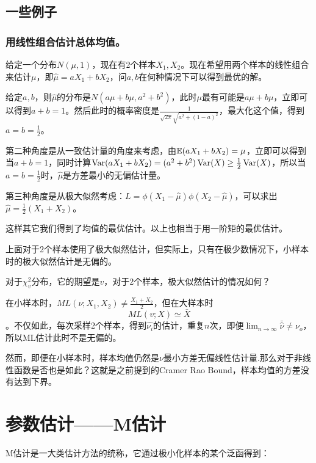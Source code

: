 \subsection{一些例子}
\subsubsection{用线性组合估计总体均值。}
\begin{example}
给定一个分布$N(\mu,1)$，现在有2个样本$X_1,X_2$。现在希望用两个样本的线性组合来估计$\mu$，即$\hat{\mu}=aX_1+bX_2$，问$a,b$在何种情况下可以得到最优的解。
\end{example}
\begin{solution}
给定$a,b$，则$\hat{\mu}$的分布是$N(a\mu+b\mu,a^2+b^2)$，此时$\mu$最有可能是$a\mu+b\mu$，立即可以得到$a+b=1$。然后此时的概率密度是$\frac{1}{\sqrt{2\pi}\sqrt{a^2+(1-a)^2}}$，最大化这个值，得到$a=b=\frac{1}{2}$。

第二种角度是从一致估计量的角度来考虑，由$\operatorname{\mathbb{E}}(aX_1+bX_2)=\mu$，立即可以得到当$a+b=1$，同时计算$\operatorname{Var}(aX_1+bX_2)=(a^2+b^2)\operatorname{Var}(X)\geq \frac{1}{2}\operatorname{Var}(X)$，所以当$a=b=\frac{1}{2}$时，$\hat{\mu}$是方差最小的无偏估计量。

第三种角度是从极大似然考虑：$L=\phi(X_1-\hat{\mu})\phi(X_2-\hat{\mu})$，可以求出$\hat{\mu}=\frac{1}{2}(X_1+X_2)$。
	
这样其它我们得到了均值的最优估计。以上也相当于用一阶矩的最优估计。

\end{solution}
上面对于2个样本使用了极大似然估计，但实际上，只有在极少数情况下，小样本时的极大似然估计是无偏的。
\begin{example}
对于$\chi^2_v$分布，它的期望是$v$，对于2个样本，极大似然估计的情况如何？
\end{example}
\begin{solution}
在小样本时，$ML(\nu;X_1,X_2)\neq \frac{X_1+X_2}{2}$，但在大样本时
$$ML(v;X)\simeq \bar{X}$$。不仅如此，每次采样2个样本，得到$\hat{\nu_i}$的估计，重复$n$次，即便$\lim_{n\rightarrow \infty}\bar{\hat{\nu}}\neq \nu_o$，所以ML估计此时不是无偏的。

然而，即便在小样本时，样本均值仍然是$\nu$最小方差无偏线性估计量.那么对于非线性函数是否也是如此？这就是之前提到的Cramer Rao Bound，样本均值的方差没有达到下界。


\end{solution}
\section{参数估计——M估计}
M估计是一大类估计方法的统称，它通过极小化样本的某个泛函得到：

